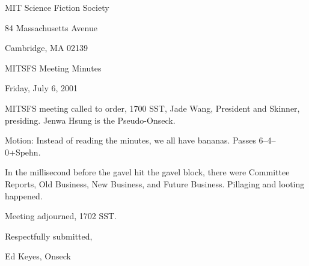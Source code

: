 \documentclass[12pt]{article}
\begin{document}
\begin{center}

MIT Science Fiction Society 

84 Massachusetts Avenue

Cambridge, MA 02139

\vspace{12pt}

MITSFS Meeting Minutes 

Friday, July 6, 2001

\end{center}
 
\vspace{18pt}

\setlength{\parskip}{6pt}

\noindent
MITSFS meeting called to order, 1700 SST, Jade Wang, President and
Skinner, presiding.  Jenwa Hsung is the Pseudo-Onseck.

Motion: Instead of reading the minutes, we all have bananas.
Passes 6--4--0+Spehn.

In the millisecond before the gavel hit the gavel block, there were
Committee Reports, Old Business, New Business, and Future Business.
Pillaging and looting happened.

\vspace{12pt}

\noindent
Meeting adjourned, 1702 SST.

\vspace{18pt}

\centerline{Respectfully submitted,}
\centerline{Ed Keyes, Onseck}
\end{document}
